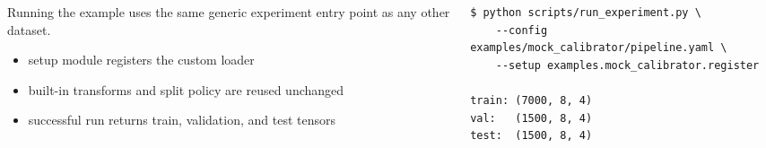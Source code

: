 \begin{frame}

  \vfill
  \begin{columns}[c,onlytextwidth]
    \begin{column}{0.42\textwidth}
      {\small Running the example uses the same generic experiment entry point as any other dataset.}\par
      \vspace{1.5mm}
      \begin{itemize}
        \item setup module registers the custom loader
        \item built-in transforms and split policy are reused unchanged
        \item successful run returns train, validation, and test tensors
      \end{itemize}
    \end{column}
    \begin{column}{0.54\textwidth}
\begin{lstlisting}[numbers=none]
$ python scripts/run_experiment.py \
    --config examples/mock_calibrator/pipeline.yaml \
    --setup examples.mock_calibrator.register

train: (7000, 8, 4)
val:   (1500, 8, 4)
test:  (1500, 8, 4)
\end{lstlisting}
    \end{column}
  \end{columns}

  \slideheaderfooter
\end{frame}
